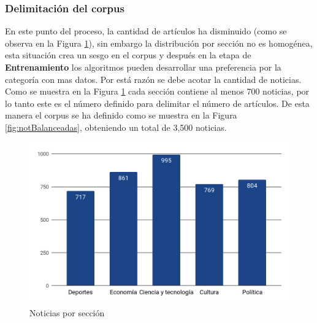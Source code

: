 \subsubsection{Delimitación del corpus}

En este punto del proceso, la cantidad de artículos ha disminuido (como se observa en la Figura \ref{fig:cp5:noticiasSecciones}), sin embargo la distribución por sección no es homogénea, esta situación crea un sesgo en el corpus y después en la etapa de \textbf{Entrenamiento} los algoritmos pueden desarrollar una preferencia por la categoría con mas datos. Por está razón se debe acotar la cantidad de noticias.\\

Como se muestra en la Figura \ref{fig:cp5:noticiasSecciones} cada sección contiene al menos 700 noticias, por lo tanto este es el número definido para delimitar el número de artículos. De esta manera el corpus se ha definido como se muestra en la Figura \ref{fig:notBalanceadas}, obteniendo un total de 3,500 noticias.\\

\begin{figure}[H]
	\centering
	\includegraphics[scale=.33]{imagenes/Capitulo5/Entrenamiento/noticiasSecciones.png}
	\caption{Noticias por sección}
	\label{fig:cp5:noticiasSecciones}
\end{figure}


